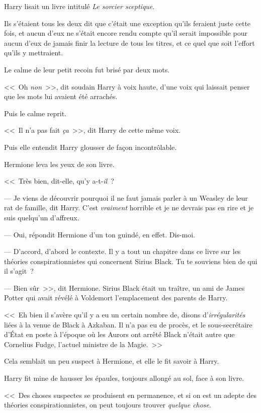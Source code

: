 Harry lisait un livre intitulé \emph{Le sorcier sceptique}.

Ils s'étaient tous les deux dit que c'était une exception qu'ils feraient juste cette fois, et aucun d'eux ne s'était encore rendu compte qu'il serait impossible pour aucun d'eux de jamais finir la lecture de tous les titres, et ce quel que soit l'effort qu'ils y mettraient.

Le calme de leur petit recoin fut brisé par deux mots.

<<~Oh \emph{non}~>>, dit soudain Harry à voix haute, d'une voix qui laissait penser que les mots lui avaient été arrachés.

Puis le calme reprit.

<<~Il n'a pas fait \emph{ça}~>>, dit Harry de cette même voix.

Puis elle entendit Harry glousser de façon incontrôlable.

Hermione leva les yeux de son livre.

<<~Très bien, dit-elle, qu'y a-t-\emph{il}~?

--- Je viens de découvrir pourquoi il ne faut jamais parler à un Weasley de leur rat de famille, dit Harry. C'est \emph{vraiment} horrible et je ne devrais pas en rire et je suis quelqu'un d'affreux.

--- Oui, répondit Hermione d'un ton guindé, en effet. Dis-moi.

--- D'accord, d'abord le contexte. Il y a tout un chapitre dans ce livre sur les théories conspirationnistes qui concernent Sirius Black. Tu te souviens bien de qui il s'agit~?

--- Bien sûr~>>, dit Hermione. Sirius Black était un traître, un ami de James Potter qui avait révélé à Voldemort l'emplacement des parents de Harry.

<<~Eh bien il s'avère qu'il y a eu un certain nombre de, disons d'\emph{irrégularités} liées à la venue de Black à Azkaban. Il n'a pas eu de procès, et le sous-secrétaire d'État en poste à l'époque où les Aurors ont arrêté Black n'était autre que Cornelius Fudge, l'actuel ministre de la Magie.~>>

Cela semblait un peu suspect à Hermione, et elle le fit savoir à Harry.

Harry fit mine de hausser les épaules, toujours allongé au sol, face à son livre.

<<~Des choses suspectes se produisent en permanence, et si on est un adepte des théories conspirationnistes, on peut toujours trouver \emph{quelque chose}.

